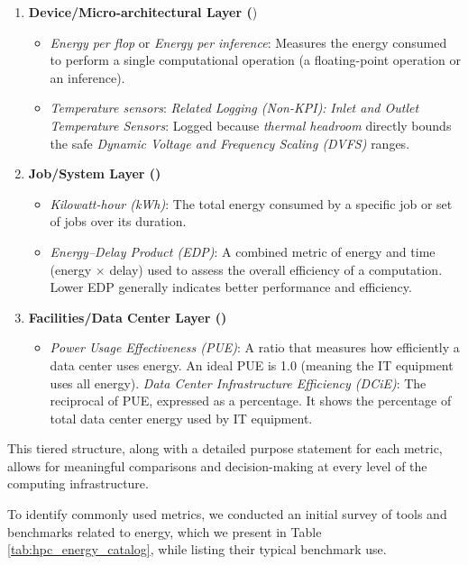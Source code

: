 \begin{enumerate}%

\item {\bf Device/Micro-architectural Layer (\mmD})
\begin{itemize}
        \item {\em Energy per flop} or {\em Energy per inference}: Measures the energy consumed to perform a single computational operation (a floating-point operation or an inference).
        \item {\em Temperature sensors}: {\em Related Logging (Non-KPI):} {\em Inlet and Outlet Temperature Sensors}: Logged because {\em thermal headroom} directly bounds the safe {\em Dynamic Voltage and Frequency Scaling (DVFS)} ranges.
\end{itemize}
\item {\bf Job/System Layer (\mmJ)}
\begin{itemize}

        \item {\em Kilowatt-hour (kWh)}: The total energy consumed by a specific job or set of jobs over its duration.
        \item {\em Energy--Delay Product (EDP)}: A combined metric of energy and time (energy $\times$ delay) used to assess the overall efficiency of a computation. Lower EDP generally indicates better performance and efficiency.
\end{itemize}

\item {\bf Facilities/Data Center Layer (\mmF)}
\begin{itemize}

        \item {\em Power Usage Effectiveness (PUE)}: A ratio that measures how efficiently a data center uses energy. An ideal PUE is 1.0 (meaning the IT equipment uses all energy).
        {\em Data Center Infrastructure Efficiency (DCiE)}: The reciprocal of PUE, expressed as a percentage. It shows the percentage of total data center energy used by IT equipment.
\end{itemize}

\end{enumerate}

This tiered structure, along with a detailed purpose statement for each metric, allows for meaningful comparisons and decision-making at every level of the computing infrastructure.

To identify commonly used metrics, we conducted an initial survey of tools and benchmarks related to energy, which we present in 
Table \ref{tab:hpc_energy_catalog}, while listing their typical benchmark use.

